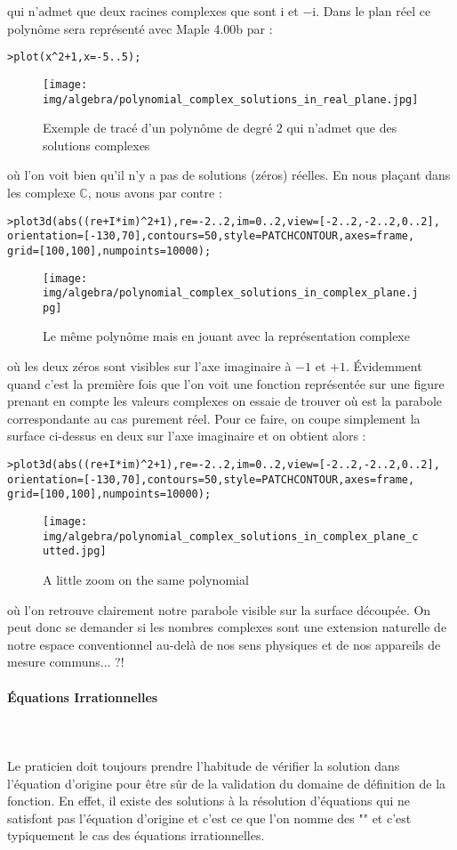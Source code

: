 	qui n'admet que deux racines complexes que sont $\mathrm{i}$ et $-\mathrm{i}$. Dans le plan réel ce polynôme sera représenté avec Maple 4.00b par :
	
	\texttt{>plot(x\string^2+1,x=-5..5);}
	\begin{figure}[H]
		\centering
		\texttt{[image: img/algebra/polynomial\_complex\_solutions\_in\_real\_plane.jpg]}
		\caption[]{Exemple de tracé d'un polynôme de degré $2$ qui n'admet que des solutions complexes}
	\end{figure}
	où l'on voit bien qu'il n'y a pas de solutions (zéros) réelles. En nous plaçant dans les complexe $\mathbb{C}$, nous avons par contre :
	
	\texttt{>plot3d(abs((re+I*im)\string^2+1),re=-2..2,im=0..2,view=[-2..2,-2..2,0..2],\\
	orientation=[-130,70],contours=50,style=PATCHCONTOUR,axes=frame,\\
	grid=[100,100],numpoints=10000);}
	\begin{figure}[H]
		\centering
		\texttt{[image: img/algebra/polynomial\_complex\_solutions\_in\_complex\_plane.jpg]}
		\caption[]{Le même polynôme mais en jouant avec la représentation complexe}
	\end{figure}
	où les deux zéros sont visibles sur l'axe imaginaire à $-1$ et $+1$. Évidemment quand c'est la première fois que l'on voit une fonction représentée sur une figure prenant en compte les valeurs complexes on essaie de trouver où est la parabole correspondante au cas purement réel. Pour ce faire, on coupe simplement la surface ci-dessus en deux sur l'axe imaginaire et on obtient alors :
	
	\texttt{>plot3d(abs((re+I*im)\string^2+1),re=-2..2,im=0..2,view=[-2..2,-2..2,0..2],\\
	orientation=[-130,70],contours=50,style=PATCHCONTOUR,axes=frame,\\
	grid=[100,100],numpoints=10000);}
	\begin{figure}[H]
		\centering
		\texttt{[image: img/algebra/polynomial\_complex\_solutions\_in\_complex\_plane\_cutted.jpg]}
		\caption[]{A little zoom on the same polynomial}
	\end{figure}
	où l'on retrouve clairement notre parabole visible sur la surface découpée. On peut donc se demander si les nombres complexes sont une extension naturelle de notre espace conventionnel au-delà de nos sens physiques et de nos appareils de mesure communs... ?!

	\paragraph{Équations Irrationnelles}\mbox{}\\\\
	Le praticien doit toujours prendre l'habitude de vérifier la solution dans l'équation d'origine pour être sûr de la validation du domaine de définition de la fonction. En effet, il existe des solutions à la résolution d'équations qui ne satisfont pas l'équation d'origine et c'est ce que l'on nomme des  "" et c'est typiquement le cas des équations irrationnelles.

